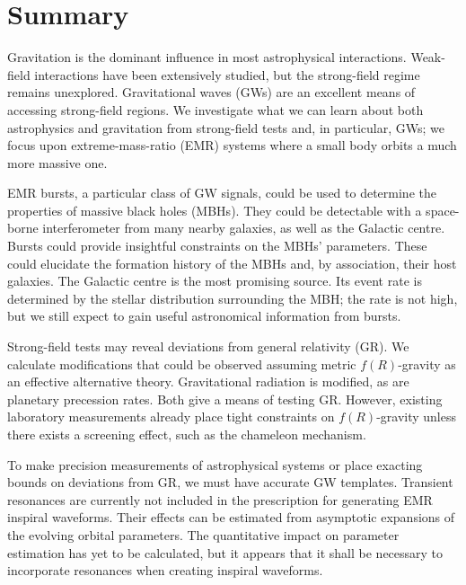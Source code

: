 \chapter{Summary}
\label{summary}

Gravitation is the dominant influence in most astrophysical interactions. Weak-field interactions have been extensively studied, but the strong-field regime remains unexplored. Gravitational waves (GWs) are an excellent means of accessing strong-field regions. We investigate what we can learn about both astrophysics and gravitation from strong-field tests and, in particular, GWs; we focus upon extreme-mass-ratio (EMR) systems where a small body orbits a much more massive one.

EMR bursts, a particular class of GW signals, could be used to determine the properties of massive black holes (MBHs). They could be detectable with a space-borne interferometer from many nearby galaxies, as well as the Galactic centre. Bursts could provide insightful constraints on the MBHs' parameters. These could elucidate the formation history of the MBHs and, by association, their host galaxies. The Galactic centre is the most promising source. Its event rate is determined by the stellar distribution surrounding the MBH; the rate is not high, but we still expect to gain useful astronomical information from bursts.

Strong-field tests may reveal deviations from general relativity (GR). We calculate modifications that could be observed assuming metric $f(R)$-gravity as an effective alternative theory. Gravitational radiation is modified, as are planetary precession rates. Both give a means of testing GR. However, existing laboratory measurements already place tight constraints on $f(R)$-gravity unless there exists a screening effect, such as the chameleon mechanism.

To make precision measurements of astrophysical systems or place exacting bounds on deviations from GR, we must have accurate GW templates. Transient resonances are currently not included in the prescription for generating EMR inspiral waveforms. Their effects can be estimated from asymptotic expansions of the evolving orbital parameters. The quantitative impact on parameter estimation has yet to be calculated, but it appears that it shall be necessary to incorporate resonances when creating inspiral waveforms.
